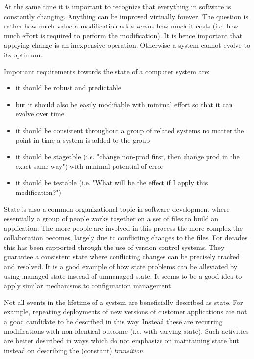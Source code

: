 \documentclass[12pt, a4paper]{article}
\begin{document}
At the same time it is important to recognize that everything in software is constantly changing. Anything can be improved virtually forever. The question is rather how much value a modification adds versus how much it costs (i.e. how much effort is required to perform the modification). It is hence important that applying change is an inexpensive operation. Otherwise a system cannot evolve to its optimum.


\vspace{0.5cm}
\begin{minipage}{\textwidth}
Important requirements towards the state of a computer system are:

\begin{itemize}
  \item it should be robust and predictable
  \item but it should also be easily modifiable with minimal effort so that it can evolve over time
  \item it should be consistent throughout a group of related systems no matter the point in time a system is added to the group
  \item it should be stageable (i.e. "change non-prod first, then change prod in the exact same way") with minimal potential of error
  \item it should be testable (i.e. "What will be the effect if I apply this modification?")
\end{itemize}
\end{minipage}
\vspace{0.5cm}

State is also a common organizational topic in software development where essentially a group of people works together on a set of files to build an application. The more people are involved in this process the more complex the collaboration becomes, largely due to conflicting changes to the files. For decades this has been supported through the use of version control systems. They guarantee a consistent state where conflicting changes can be precisely tracked and resolved. It is a good example of how state problems can be alleviated by using managed state instead of unmanaged state. It seems to be a good idea to apply similar mechanisms to configuration management. 

Not all events in the lifetime of a system are beneficially described as state. For example, repeating deployments of new versions of customer applications are not a good candidate to be described in this way. Instead these are recurring modifications with non-identical outcome (i.e. with varying state). Such activities are better described in ways which do not emphasize on maintaining state but instead on describing the (constant) \textit{transition}.
\end{document}
